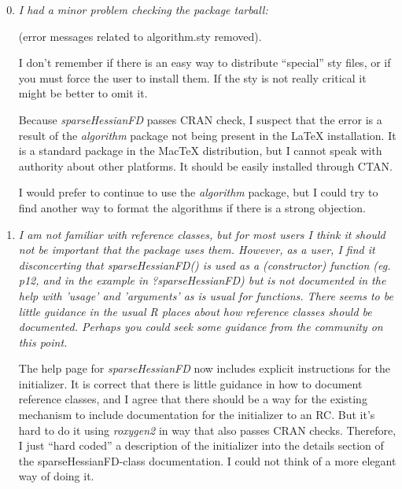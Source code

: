 \documentclass{article}
\newcommand{\pkg}[1]{\emph{#1}}
\newenvironment{revQuote}{\itshape}{\vspace{\baselineskip}}
\newenvironment{response}{\normalfont}{\vspace{\baselineskip}}
\begin{document}
\begin{enumerate}[align=left]
 \setcounter{enumi}{-1}

\item \begin{revQuote}
I had a minor problem checking the package tarball:

(error messages related to algorithm.sty removed).

I don't remember if there is an easy way to distribute ``special'' sty files,
or if you must force the user to install them. If the sty is not really
critical it might be better to omit it.  
  
\end{revQuote}

\begin{response}
Because \pkg{sparseHessianFD} passes CRAN check, I suspect that the
error is a result of the \pkg{algorithm} package
not being present in the LaTeX installation.  It is a standard
package in the MacTeX distribution, but I cannot speak with authority about other
platforms. It should be easily installed through CTAN.

I would prefer to continue to use the \pkg{algorithm} package, but I
could try to find another way to format the algorithms if there is a
strong objection.
\end{response}

\item \begin{revQuote}
I am not familiar with reference classes, but for most users I think it
should not be important that the package uses them. However, as a user, I
find it disconcerting that sparseHessianFD() is used as a (constructor)
function (eg. p12, and in the example in ?sparseHessianFD) but is not
documented in the help with 'usage' and 'arguments' as is usual for
functions. There seems to be little guidance in the usual R places about how
reference classes should be documented. Perhaps you could seek some guidance
from the community on this point.
\end{revQuote}


\begin{response}
The help page for \pkg{sparseHessianFD} now includes explicit
instructions for the initializer.  It is correct that there is
little guidance in how to document reference classes, and I agree that
there should be a way for the
existing mechanism to include documentation for the initializer to
an RC.  But it's hard to do it using \pkg{roxygen2} in way that also passes
CRAN checks. Therefore, I just ``hard coded'' a description of the initializer
into the details section of the sparseHessianFD-class documentation. I
could not think of a more elegant way of doing it.  
\end{response}




\end{enumerate}
\end{document}
